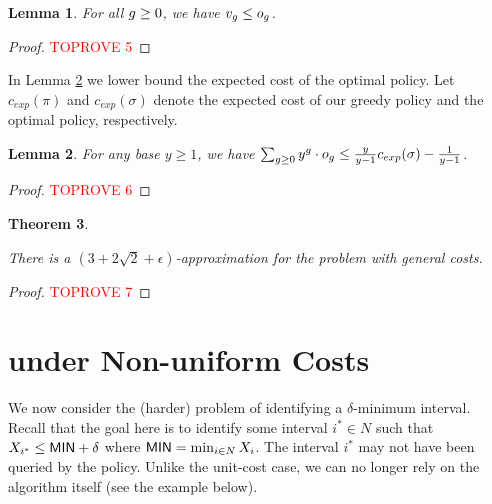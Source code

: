 \documentclass[11pt]{article}
\newcommand{\base}{y}
\newtheorem{thm}{Theorem}[section]
\newtheorem{lem}[thm]{Lemma}
\theoremstyle{remark}
\theoremstyle{plain}
\theoremstyle{remark}
\begin{document}
 \begin{lem} For all $g \ge 0$, we have $v_g \le o_g$. 
 \label{lem:aioi}
 \end{lem}
\begin{proof}\textcolor{red}{TOPROVE 5}\end{proof}



In Lemma \ref{lem:optlb} we lower bound the expected cost of the optimal policy.  Let $c_{exp}(\pi)$ and $c_{exp}(\sigma)$ denote the expected cost of our greedy policy and the optimal policy, respectively.

\begin{lem}
\label{lem:optlb}
For any base   $y \ge 1$, we have $\sum_{\i\ge 0}{\base^\i \cdot o_\i} \leq  \frac{\base }{\base-1} c_{exp}(\sigma) - \frac1{y-1}$.   
\end{lem}
\begin{proof}\textcolor{red}{TOPROVE 6}\end{proof}


\begin{thm}
\label{thm:gencost}

    There is a $( 3+ 2\sqrt{2} + \epsilon)$-approximation for the \smq problem with general costs.  
\end{thm}

\begin{proof}\textcolor{red}{TOPROVE 7}\end{proof}





\section{\smqi under Non-uniform Costs}
We now consider the (harder) problem of identifying a $\delta$-minimum interval. Recall that the goal here is  to identify some interval $i^*\in N$ such that $X_{i^*}\le {\sf MIN} +\delta$ where  ${\sf MIN}=\min_{i\in N} X_i$. The interval $i^*$ may not have been queried by the policy. Unlike the unit-cost case, we can no longer rely on the \smq algorithm itself (see the example below). 
\end{document}
